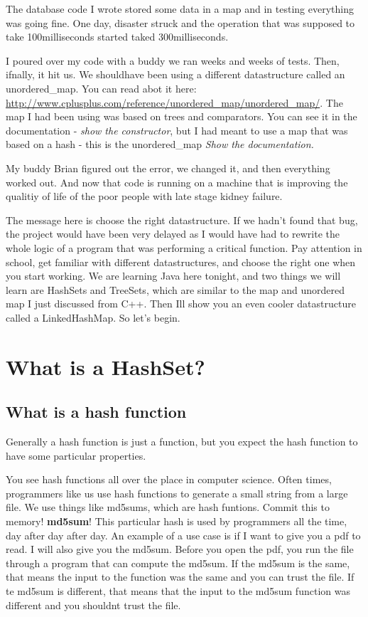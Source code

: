 \documentclass[12pt]{article}
\begin{document}
The database code I wrote stored some data in a map and in testing everything was going fine. One day, disaster struck and the operation that was supposed to take 100milliseconds started taked 300milliseconds.

I poured over my code with a buddy we ran weeks and weeks of tests. Then, ifnally, it hit us. We shouldhave been using a different datastructure called an unordered\_map. You can read abot it here: \url{http://www.cplusplus.com/reference/unordered_map/unordered_map/}. The map I had been using was based on trees and comparators. You can see it in the documentation - \textit{show the constructor}, but I had meant to use a map that was based on a hash - this is the unordered\_map \textit{Show the documentation.}

My buddy Brian figured out the error, we changed it, and then everything worked out. And now that code is running on a machine that is improving the qualitiy of life of the poor people with late stage kidney failure. 

The message here is choose the right datastructure. If we hadn't found that bug, the project would have been very delayed as I would have had to rewrite the whole logic of a program that was performing a critical function. Pay attention in school, get familiar with different datastructures, and choose the right one when you start working. We are learning Java here tonight, and two things we will learn are HashSets and TreeSets, which are similar to the map and unordered map I just discussed from C++. Then Ill show you an even cooler datastructure called a LinkedHashMap. So let's begin.


\section{What is a HashSet?}

\subsection{What is a hash function}
Generally a hash function is just a function, but you expect the hash function to have some particular properties. 

You see hash functions all over the place in computer science. Often times, programmers like us use hash functions to generate a small string from a large file. We use things like md5sums, which are hash funtions. Commit this to memory! \textbf{md5sum}! This particular hash is used by programmers all the time, day after day after day. An example of a use case is if I want to give you a pdf to read. I will also give you the md5sum. Before you open the pdf, you run the file through a program that can compute the md5sum. If the md5sum is the same, that means the input to the function was the same and you can trust the file. If te md5sum is different, that means that the input to the md5sum function was different and you shouldnt trust the file.
\end{document}
